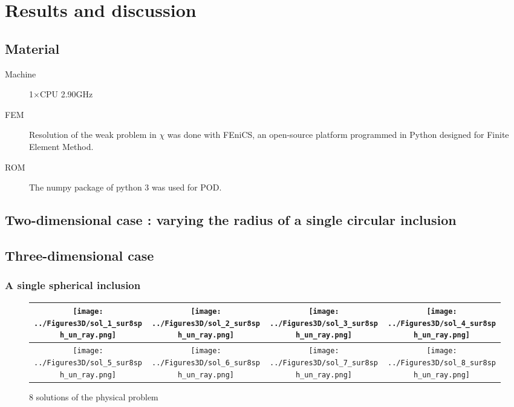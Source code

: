 \section{Results and discussion}\label{res}


\subsection{Material}

\begin{description}
\item [Machine] 1$\times$CPU 2.90GHz
\item [FEM] Resolution of the weak problem in $\chi$ was done with FEniCS, %
an open-source platform programmed in Python designed for Finite Element Method.
\item [ROM] The numpy package of python 3 was used for POD.
\end{description}

\subsection{Two-dimensional case : varying the radius of a single circular inclusion}

\dotfill

\subsection{Three-dimensional case}

\subsubsection{A single spherical inclusion}

\begin{figure}[H]
%
\begin{center}
\begin{tabular}{|c|c|c|c|}
\hline
\texttt{[image: ../Figures3D/sol\_1\_sur8sph\_un\_ray.png]}%
&%
\texttt{[image: ../Figures3D/sol\_2\_sur8sph\_un\_ray.png]}%
&%
\texttt{[image: ../Figures3D/sol\_3\_sur8sph\_un\_ray.png]}%
&%
\texttt{[image: ../Figures3D/sol\_4\_sur8sph\_un\_ray.png]}%
\\
\hline
\texttt{[image: ../Figures3D/sol\_5\_sur8sph\_un\_ray.png]}%
&%
\texttt{[image: ../Figures3D/sol\_6\_sur8sph\_un\_ray.png]}%
&%
\texttt{[image: ../Figures3D/sol\_7\_sur8sph\_un\_ray.png]}%
&%
\texttt{[image: ../Figures3D/sol\_8\_sur8sph\_un\_ray.png]}%
\\
\hline
\end{tabular}
\end{center}
\caption{$8$ solutions of the physical problem}
%
\end{figure}

